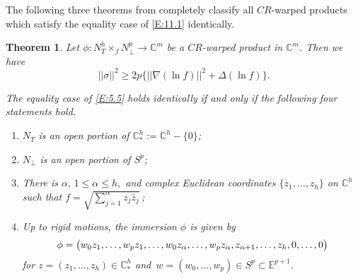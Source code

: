 \documentclass{amsart}
\theoremstyle{plain}
\newtheorem{theorem}{Theorem}[section]
\numberwithin{equation}{section}
\theoremstyle{remark}
\numberwithin{equation}{section}
\begin{document}
The following three theorems  from \cite{c11} completely classify all $CR$-warped products which satisfy the equality case of \eqref{E:11.1} identically.

 \begin{theorem}\label{T:11.2}  Let
$\phi:N_T^h\times_f N_\perp^p\to {\mathbb C}^m$ be a  $CR$-warped product in  $\mathbb C^m$. Then we have
\begin{equation}\label{E:5.5}||\sigma||^2\geq 2p\big\{||\nabla(\ln f)||^2+\Delta(\ln f)\big\}.\end{equation}

 The  equality case of \eqref{E:5.5} holds identically if and only if the following four statements hold.
\begin{enumerate}
\item $N_T$ is an open portion of $\mathbb  C^h_*:=\mathbb  C^h-\{0\}$;

\item $N_\perp$ is an open portion of $S^p$;

\item There is $\alpha,\, 1\leq\alpha\leq h,$ and complex Euclidean  coordinates $\{z_1,\ldots,z_h\}$ on $\mathbb C^h$ such that $f=\sqrt{\sum_{j=1}^\alpha z_j\bar z_j}$\,; 

\item Up to rigid motions, the immersion $\phi$ is given by
\begin{equation}\notag\phi=\big(w_0 z_1,\ldots,w_p z_1,\ldots,w_0z_\alpha ,\ldots, w_p z_\alpha ,z_{\alpha
+1},\ldots,z_h,0,\ldots,0\big)\end{equation} for $z=(z_1,\ldots,z_h)\in {\mathbb C}_*^h$ and $\,w=(w_0,\ldots,w_p)\in S^p\subset{\mathbb E}^{p+1}$.
\end{enumerate} \end{theorem} 
\end{document}
